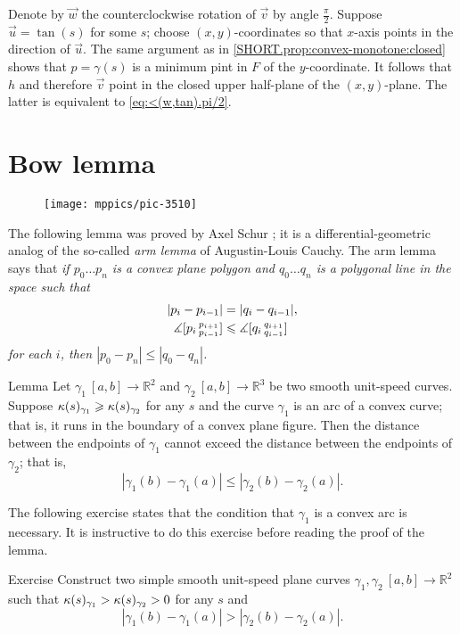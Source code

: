 Denote by $\vec w$ the counterclockwise rotation of $\vec v$ by angle $\tfrac\pi 2$.
Suppose $\vec u=\tan (s)$ for some $s$;
choose $(x,y)$-coordinates so that $x$-axis points in the direction of $\vec u$.
The same argument as in \ref{SHORT.prop:convex-monotone:closed} shows that 
$p=\gamma(s)$ is a minimum pint in $F$ of the $y$-coordinate.
It follows that $h$ and therefore $\vec v$ point in the closed upper half-plane of the $(x,y)$-plane.
The latter is equivalent to \ref{eq:<(w,tan).pi/2}.
\qeds

\section{Bow lemma}

\begin{wrapfigure}{r}{39 mm}
\vskip-4mm
\centering
\texttt{[image: mppics/pic-3510]}
\vskip0mm
\end{wrapfigure}

The following lemma was proved by Axel Schur \cite{shur};
it is a differential-geometric analog of the so-called {}\emph{arm lemma} of Augustin-Louis Cauchy.
The arm lemma says that 
\textit{if $p_0\dots p_n$ is a convex plane polygon and $q_0\dots q_n$ is a polygonal line in the space such that 
\begin{align*}
|p_i-p_{i-1}|&=|q_i-q_{i-1}|,
\\
\measuredangle[p_i\,{}^{p_{i+1}}_{p_{i-1}}]&\leqslant \measuredangle[q_i\,{}^{q_{i+1}}_{q_{i-1}}]
\end{align*}
for each $i$, then $|p_0-p_n|\le |q_0-q_n|$.}


\begin{thm}{Lemma}\label{lem:bow}
Let $\gamma_1\:[a,b]\to\mathbb{R}^2$ and $\gamma_2\:[a,b] \to\mathbb{R}^3$ be two smooth unit-speed curves.
Suppose $\kappa(s)_{\gamma_1}\geqslant\kappa(s)_{\gamma_2}$ for any $s$ 
and the curve
$\gamma_1$ is an arc of a convex curve; that is, it runs in the boundary of a convex plane figure.
Then the distance between the endpoints of $\gamma_1$ cannot exceed the  distance between the endpoints of $\gamma_2$; that is,
\[|\gamma_1(b)-\gamma_1(a)|\le |\gamma_2(b)-\gamma_2(a)|.\]

\end{thm}

The following exercise states that the condition that $\gamma_1$ is a convex arc is necessary.
It is instructive to do this exercise before reading the proof of the lemma.

{\sloppy 

\begin{thm}{Exercise}\label{ex:anti-bow}
Construct two simple smooth unit-speed plane curves $\gamma_1,\gamma_2\:[a,b]\to\mathbb{R}^2$ such that $\kappa(s)_{\gamma_1}>\kappa(s)_{\gamma_2}>0$ for any $s$ and
\[|\gamma_1(b)-\gamma_1(a)|> |\gamma_2(b)-\gamma_2(a)|.\]
\end{thm}

}

